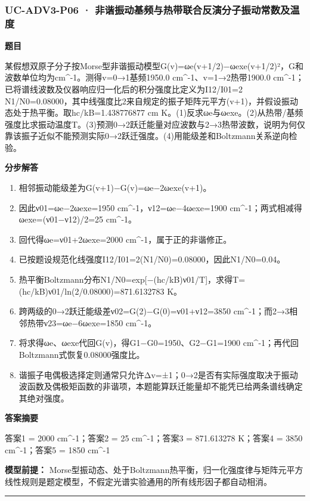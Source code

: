 \documentclass[UTF8,11pt,a4paper]{ctexart}
\begin{document}
\subsubsection*{UC-ADV3-P06 · 非谐振动基频与热带联合反演分子振动常数及温度}
\noindent\textbf{题目}\par
某假想双原子分子按Morse型非谐振动模型G(v)=ωe(v+1/2)−ωexe(v+1/2)²，G和波数单位均为cm\textasciicircum{}-1。测得v=0→1基频1950.0 cm\textasciicircum{}-1、v=1→2热带1900.0 cm\textasciicircum{}-1；已将谱线波数及仪器响应归一化后的积分强度比定义为I12/I01=2 N1/N0=0.08000，其中线强度比2来自规定的振子矩阵元平方(v+1)，并假设振动态处于热平衡。取hc/kB=1.438776877 cm K。(1)反求ωe与ωexe。(2)从热带/基频强度比求振动温度T。(3)预测0→2跃迁能量对应波数与2→3热带波数，说明为何仅靠该振子近似不能预测实际0→2跃迁强度。(4)用能级差和Boltzmann关系逆向检验。\par
\medskip\noindent\textbf{分步解答}
\begin{enumerate}
\item 相邻振动能级差为G(v+1)−G(v)=ωe−2ωexe(v+1)。
\item 因此ν01=ωe−2ωexe=1950 cm\textasciicircum{}-1，ν12=ωe−4ωexe=1900 cm\textasciicircum{}-1；两式相减得ωexe=(ν01−ν12)/2=25 cm\textasciicircum{}-1。
\item 回代得ωe=ν01+2ωexe=2000 cm\textasciicircum{}-1，属于正的非谐修正。
\item 已按题设规范化线强度I12/I01=2(N1/N0)=0.08000，因此N1/N0=0.04。
\item 热平衡Boltzmann分布N1/N0=exp[−(hc/kB)ν01/T]，求得T=(hc/kB)ν01/ln(2/0.08000)=871.6132783 K。
\item 跨两级的0→2跃迁能级差ν02=G(2)−G(0)=ν01+ν12=3850 cm\textasciicircum{}-1；而2→3相邻热带ν23=ωe−6ωexe=1850 cm\textasciicircum{}-1。
\item 将求得ωe、ωexe代回G(v)，得G1−G0=1950、G2−G1=1900 cm\textasciicircum{}-1；再代回Boltzmann式恢复0.08000强度比。
\item 谐振子电偶极选择定则通常只允许Δv=±1；0→2是否有实际强度取决于振动波函数及偶极矩函数的非谐项，本题能算跃迁能量却不能凭已给两条谱线确定其绝对强度。
\end{enumerate}
\noindent\textbf{答案摘要}\par
答案1 = 2000 cm\textasciicircum{}-1；答案2 = 25 cm\textasciicircum{}-1；答案3 = 871.613278 K；答案4 = 3850 cm\textasciicircum{}-1；答案5 = 1850 cm\textasciicircum{}-1\par
\noindent\textbf{模型前提：}
Morse型振动态、处于Boltzmann热平衡，归一化强度律与矩阵元平方线性规则是题定模型，不假定光谱实验通用的所有线形因子都自动相消。\par
\medskip\hrule\medskip
\clearpage
\end{document}
